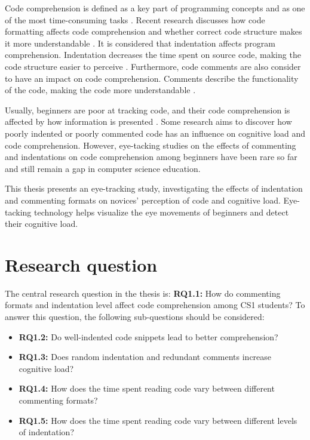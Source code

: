 Code comprehension is defined as a key part of programming concepts and as one of the most time-consuming tasks \cite{javier2021understanding}.
Recent research discusses how code formatting affects code comprehension and whether correct code structure makes it more understandable \cite{andrzejewska2020development}. It is considered that indentation affects program comprehension. Indentation decreases the time spent on source code, making the code structure easier to perceive \cite{bauer2017indentations}. Furthermore, code comments are also consider to have an impact on code comprehension. Comments describe the functionality of the code, making the code more understandable \cite{bakhuizen2019comments}.
 
Usually, beginners are poor at tracking code, and their code comprehension is affected by how information is presented \cite{robins2003learning}. Some research aims to discover how poorly indented or poorly commented code has an influence on cognitive load and code comprehension.  However, eye-tacking studies on the effects of commenting and indentations on code comprehension among beginners have been rare so far and still remain a gap in computer science education.

  
This thesis presents an eye-tracking study, investigating the effects of indentation and commenting formats on novices’ perception of code and cognitive load. Eye-tacking technology helps visualize the eye movements of beginners and detect their cognitive load. 


\section{Research question}

The central research question in the thesis is: \textbf{RQ1.1:} How do commenting formats and indentation level affect code comprehension among CS1 students? To answer this question, the following sub-questions should be considered:

\begin{itemize}
    \item \textbf{RQ1.2:} Do well-indented code snippets lead to better comprehension?
    \item \textbf{RQ1.3:} Does random indentation and redundant comments increase cognitive load?
    \item \textbf{RQ1.4:} How does the time spent reading code vary between different commenting formats?
    \item \textbf{RQ1.5:} How does the time spent reading code vary between different levels of indentation?
\end{itemize}

